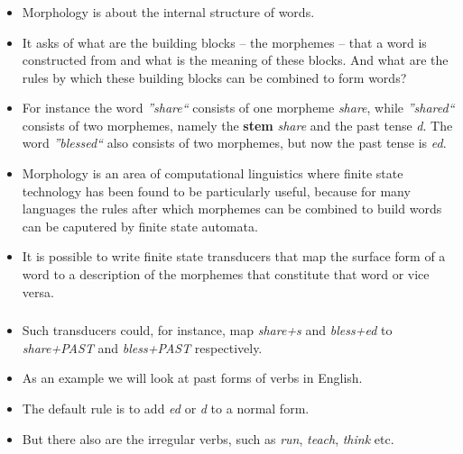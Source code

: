 \begin{frame}

	\frametitle{\insertsection}
	\framesubtitle{\insertsubsection}
	
	\begin{itemize}
		\item Morphology is about the internal structure of words.
		\item It asks of what are the building blocks -- the morphemes -- that a word is constructed from and what is the meaning of these blocks.
		 And what are the rules by which these building blocks can be combined to form words?
		\item For instance the word \textit{''share``} consists of one morpheme \textit{share}, while \textit{''shared``} consists of two morphemes, namely
		the \textbf{stem} \textit{share} and the past tense \textit{d}. The word \textit{''blessed``} also consists of two morphemes, but now the past tense
		is \textit{ed}.
		\item Morphology is an area of computational linguistics where finite state technology has been found to be particularly useful, because for many languages the rules after which morphemes can be combined to build words can be caputered by finite state automata.
		\item It is possible to write finite state transducers that map the surface form of a word to a description of the morphemes that constitute that word or vice versa.
	\end{itemize}
	

\end{frame}



\begin{frame}

	\frametitle{\insertsection}
	\framesubtitle{\insertsubsection}
	
	\begin{itemize}
		\item Such transducers could, for instance, map \textit{share+s} and \textit{bless+ed} to \textit{share+PAST} and \textit{bless+PAST} respectively.
		\item As an example we will look at past forms of verbs in English.
		\item The default rule is to add \textit{ed} or \textit{d} to a normal form.
		\item But there also are the irregular verbs, such as \textit{run}, \textit{teach}, \textit{think} etc.
	\end{itemize}

\end{frame}


